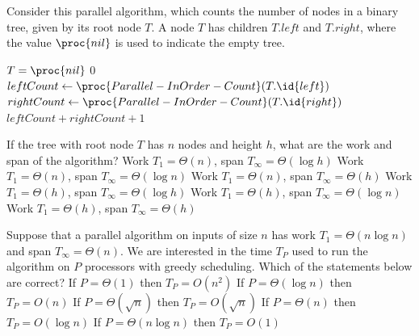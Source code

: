 Consider this parallel algorithm, which counts the number of nodes in a binary tree, given by its root node $T$.
A node $T$ has children $T.left$ and $T.right$, where the value $\proc{nil}$ is used to indicate the empty tree.

\begin{codebox}
\li \If $T = \proc{nil}$
\li \Then \Return $0$
\li \Else
\li     \Spawn $leftCount \gets \proc{Parallel-InOrder-Count}(T.\id{left})$
\li     $rightCount \gets \proc{Parallel-InOrder-Count}(T.\id{right})$
\li     \Sync
\li     \Return $leftCount + rightCount + 1$
\end{codebox}
If the tree with root node $T$ has $n$ nodes and height $h$, what are the work and span of the algorithm?
\oneanswer
\optionsstart
\answer Work $T_1=\Theta(n)$, span $T_\infty=\Theta(\log h)$
\answer Work $T_1=\Theta(n)$, span $T_\infty=\Theta(\log n)$
\answer Work $T_1=\Theta(n)$, span $T_\infty=\Theta(h)$ \correct
\answer Work $T_1=\Theta(h)$, span $T_\infty=\Theta(\log h)$
\answer Work $T_1=\Theta(h)$, span $T_\infty=\Theta(\log n)$
\answer Work $T_1=\Theta(h)$, span $T_\infty=\Theta(h)$
\optionsend
{}

Suppose that a parallel algorithm on inputs of size $n$ has work $T_1=\Theta(n \log n)$ and span $T_\infty=\Theta(n)$.
We are interested in the time $T_P$ used to run the algorithm on $P$ processors with greedy scheduling.
Which of the statements below are correct?
\multipleanswers
\optionsstart
\answer If $P = \Theta(1)$ then $T_P = O(n^2)$ \correct
\answer If $P = \Theta(\log{n})$ then $T_P = O(n)$ \correct
\answer If $P = \Theta(\sqrt{n})$ then $T_P = O(\sqrt{n})$
\answer If $P = \Theta(n)$ then $T_P = O(\log n)$
\answer If $P = \Theta(n \log n)$ then $T_P = O(1)$
\optionsend
{}


